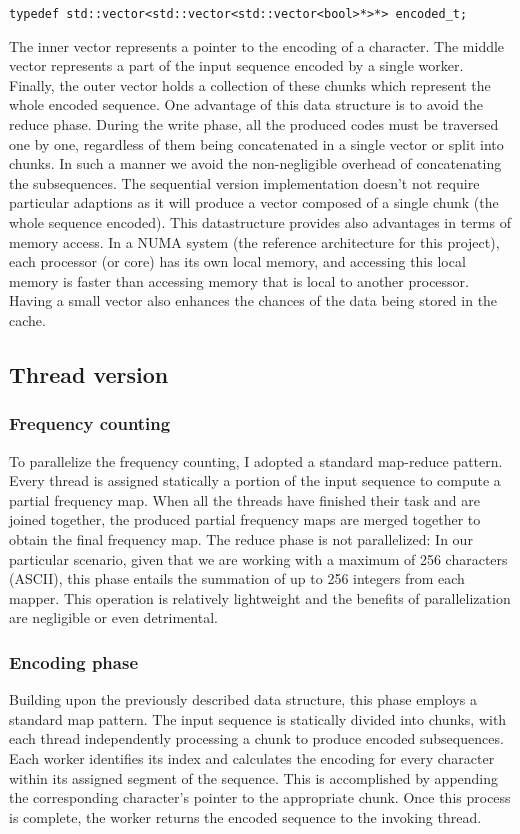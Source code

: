 \documentclass{article}
\begin{document}
\begin{verbatim}
typedef std::vector<std::vector<std::vector<bool>*>*> encoded_t;
\end{verbatim}

The inner vector represents a
pointer to the encoding of a character. The middle vector
represents a part of the input sequence encoded by a single worker.
Finally, the outer vector holds a collection of these chunks which represent
the whole encoded sequence.
One advantage of this data structure is to avoid the reduce phase.
During the write phase, all the produced codes must be traversed one by one, regardless
of them being concatenated in a single vector or split into chunks. In such a manner we
avoid the non-negligible overhead of concatenating the subsequences.
The sequential version implementation doesn't not require particular adaptions as it
will produce a vector composed of a single chunk (the whole sequence encoded).
This datastructure provides also advantages in terms of memory access.
In a NUMA system (the reference architecture for this project), each processor (or core) has its own local memory,
and accessing this local memory is faster than accessing memory that is local to another processor.
Having a small vector also enhances the chances of the data being stored in the cache.

\subsection{Thread version}
\subsubsection{Frequency counting}
To parallelize the frequency counting, I adopted a standard
map-reduce pattern. Every thread is assigned statically a portion of
the input sequence to compute a partial frequency map.
When all the threads have finished their task and are joined together,
the produced partial frequency maps are merged together to obtain the final
frequency map. The reduce phase is not parallelized:
In our particular scenario, given that we are working with a maximum of 256 characters (ASCII),
this phase entails the summation of up to 256 integers from each mapper.
This operation is relatively lightweight and the benefits of parallelization are negligible
or even detrimental.
\subsubsection{Encoding phase}
Building upon the previously described data structure, this phase employs a standard map pattern.
The input sequence is statically divided into chunks, with each thread independently processing a
chunk to produce encoded subsequences.
Each worker identifies its index and calculates the encoding for every character within
its assigned segment of the sequence. This is accomplished by appending the corresponding
character's pointer to the appropriate chunk. Once this process is complete, the worker returns
the encoded sequence to the invoking thread.
\end{document}
